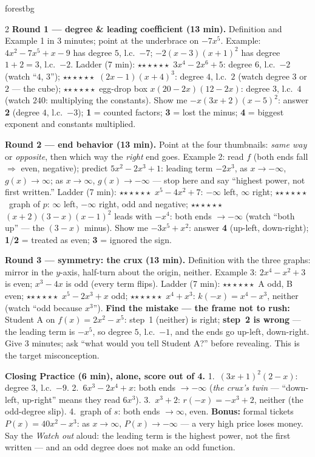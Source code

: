 \documentclass[10pt]{article}
\newcommand{\rung}[1]{{\color{goldacc}\ifcase#1\or$\star$\or$\star\star$\or$\star\star\star$\fi}}
\begin{document}
\begin{skillbox}{forestbg}
\begin{multicols}{2}
\textbf{Round 1 --- degree \& leading coefficient (13 min).} Definition and Example 1 in 3
minutes; point at the underbrace on $-7x^5$. Example: $4x^2-7x^5+x-9$ has degree $5$, l.c.\ $-7$;
$-2(x-3)(x+1)^2$ has degree $1+2=3$, l.c.\ $-2$. Ladder (7 min): \rung1\ $3x^4-2x^6+5$: degree
$6$, l.c.\ $-2$ (watch ``$4$, $3$''); \rung2\ $(2x-1)(x+4)^3$: degree $4$, l.c.\ $2$ (watch
degree $3$ or $2$ --- the cube); \rung3\ egg-drop box $x(20-2x)(12-2x)$: degree $3$, l.c.\ $4$
(watch $240$: multiplying the constants). Show me $-x(3x+2)(x-5)^2$: answer \textbf{2} (degree
$4$, l.c.\ $-3$); \textbf{1} = counted factors; \textbf{3} = lost the minus; \textbf{4} =
biggest exponent and constants multiplied.

\textbf{Round 2 --- end behavior (13 min).} Point at the four thumbnails: \emph{same way} or
\emph{opposite}, then which way the \emph{right} end goes. Example 2: read $f$ (both ends fall
$\Rightarrow$ even, negative); predict $5x^2-2x^3+1$: leading term $-2x^3$, as $x\to-\infty$,
$g(x)\to\infty$; as $x\to\infty$, $g(x)\to-\infty$ --- stop here and say ``highest power, not
first written.'' Ladder (7 min): \rung1\ $x^5-4x^2+7$: $-\infty$ left, $\infty$ right;
\rung2\ graph of $p$: $\infty$ left, $-\infty$ right, odd and negative; \rung3\
$(x+2)(3-x)(x-1)^2$ leads with $-x^4$: both ends $\to-\infty$ (watch ``both up'' --- the
$(3-x)$ minus). Show me $-3x^5+x^2$: answer \textbf{4} (up-left, down-right); \textbf{1}/\textbf{2}
= treated as even; \textbf{3} = ignored the sign.

\columnbreak
\textbf{Round 3 --- symmetry: the crux (13 min).} Definition with the three graphs: mirror in
the $y$-axis, half-turn about the origin, neither. Example 3: $2x^4-x^2+3$ is even;
$x^3-4x$ is odd (every term flips). Ladder (7 min): \rung1\ A odd, B even; \rung2\
$x^5-2x^3+x$ odd; \rung3\ $x^4+x^3$: $k(-x)=x^4-x^3$, neither (watch ``odd because $x^3$'').
\textbf{Find the mistake --- the frame not to rush:} Student A on $f(x)=2x^2-x^5$: step~1
(neither) is right; \textbf{step~2 is wrong} --- the leading term is $-x^5$, so degree $5$,
l.c.\ $-1$, and the ends go up-left, down-right. Give 3 minutes; ask ``what would you tell
Student A?'' before revealing. This is the target misconception.

\textbf{Closing Practice (6 min), alone, score out of 4.} 1.\ $(3x+1)^2(2-x)$: degree $3$, l.c.\
$-9$. 2.\ $6x^3-2x^4+x$: both ends $\to-\infty$ (\emph{the crux's twin} --- ``down-left,
up-right'' means they read $6x^3$). 3.\ $x^3+2$: $r(-x)=-x^3+2$, neither (the odd-degree slip).
4.\ graph of $s$: both ends $\to\infty$, even. \textbf{Bonus:} formal tickets
$P(x)=40x^2-x^3$: as $x\to\infty$, $P(x)\to-\infty$ --- a very high price loses money. Say the
\emph{Watch out} aloud: the leading term is the highest power, not the first written --- and an
odd degree does not make an odd function.
\end{multicols}
\end{skillbox}
\end{document}
